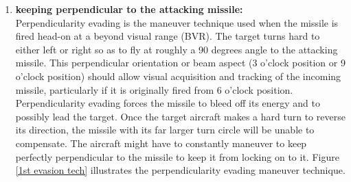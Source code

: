 \begin{enumerate}
	\item \textbf{keeping perpendicular to the attacking missile:}\\
	Perpendicularity evading is the maneuver technique used when the missile is fired head-on at a beyond visual range (BVR). The target turns hard to either left or right so as to fly at roughly a 90 degrees angle to the attacking missile. This perpendicular orientation or beam aspect (3 o'clock position or 9 o'clock position) should allow visual acquisition and tracking of the incoming missile, particularly if it is originally fired from 6 o'clock position. 
	Perpendicularity evading forces the missile to bleed off its energy and to possibly lead the target. Once the target aircraft makes a hard turn to reverse its direction, the missile with its far larger turn circle will be unable to compensate. The aircraft might have to constantly maneuver to keep perfectly perpendicular to the missile to keep it from locking on to it. Figure \ref{1st evasion tech} illustrates the perpendicularity evading maneuver technique.
	

\end{enumerate}
